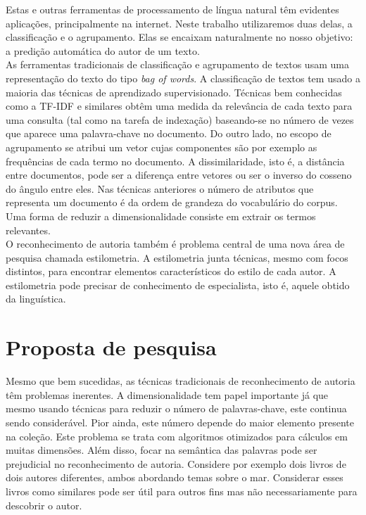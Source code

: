 \documentclass[a4paper,openright,12pt]{report} %
\begin{document}
Estas e outras ferramentas de processamento de l\'ingua natural t\^em evidentes aplica\c c\~oes, principalmente na internet. Neste trabalho utilizaremos duas delas, a classifica\c c\~ao e o agrupamento. Elas se encaixam naturalmente no nosso objetivo: a predi\c c\~ao autom\'atica do autor de um texto.\\

As ferramentas tradicionais de classifica\c c\~ao e agrupamento de textos usam uma representa\c c\~ao do texto do tipo \textit{bag of words}. A classifica\c c\~ao de textos tem usado a maioria das t\'ecnicas de aprendizado supervisionado. T\'ecnicas bem conhecidas como a TF-IDF e similares obt\^em uma medida da relev\^ancia de cada texto para uma consulta (tal como na tarefa de indexa\c c\~ao) baseando-se no n\'umero de vezes que aparece uma palavra-chave no documento. Do outro lado, no escopo de agrupamento se atribui um vetor cujas componentes s\~ao por exemplo as frequ\^encias de cada termo no documento. A dissimilaridade, isto \'e, a dist\^ancia entre documentos, pode ser a diferen\c ca entre vetores ou ser o inverso do cosseno do \^angulo entre eles. 
Nas t\'ecnicas anteriores o n\'umero de atributos que representa um documento \'e da ordem de grandeza do vocabul\'ario do corpus. Uma forma de reduzir a dimensionalidade consiste em extrair os termos relevantes.\\

O reconhecimento de autoria tamb\'em \'e problema central de uma nova \'area de pesquisa chamada estilometria. A estilometria junta t\'ecnicas, mesmo com focos distintos, para encontrar elementos caracter\'isticos do estilo de cada autor. A estilometria pode precisar de conhecimento de especialista, isto \'e, aquele obtido da lingu\'istica. 


\section{Proposta de pesquisa}

Mesmo que bem sucedidas, as t\'ecnicas tradicionais de reconhecimento de autoria t\^em problemas inerentes. 
A dimensionalidade tem papel importante j\'a que mesmo usando t\'ecnicas para reduzir o n\'umero de palavras-chave, este continua sendo consider\'avel. Pior ainda, este n\'umero depende do maior elemento presente na cole\c c\~ao. Este problema se trata com algoritmos otimizados para c\'alculos em muitas dimens\~oes. 
Al\'em disso, focar na sem\^antica das palavras pode ser prejudicial no reconhecimento de autoria. Considere por exemplo dois livros de dois autores diferentes, ambos abordando temas sobre o mar. Considerar esses livros como similares pode ser \'util para outros fins mas n\~ao necessariamente para descobrir o autor.\\
\end{document}
